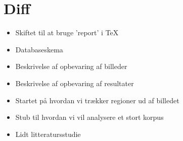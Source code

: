 {
\section*{Diff}
\begin{itemize}
    \item Skiftet til at bruge 'report' i \TeX{}
    \item Databaseskema
    \item Beskrivelse af opbevaring af billeder
    \item Beskrivelse af opbevaring af resultater
    \item Startet på hvordan vi trækker regioner ud af billedet
    \item Stub til hvordan vi vil analysere et stort korpus
	\item Lidt litteratursstudie
\end{itemize}

}


